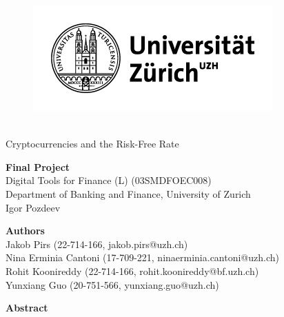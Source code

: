 \thispagestyle{empty}


\begin{figure}[!h]
\centering
\includegraphics{images/uzh_logo.pdf}\\\
\end{figure}
\vspace{1cm}

\begin{center}
\huge {Cryptocurrencies and the Risk-Free Rate}
\end{center}
\vspace{1cm}

\begin{center}
\large \textbf{Final Project}\\
\vspace{0.5cm}
Digital Tools for Finance (L) (03SMDFOEC008)\\
Department of Banking and Finance, University of Zurich\\
Igor Pozdeev
\end{center}
\vspace{1cm}

\begin{center}
\large \textbf{Authors}\\
\vspace{0.5cm}
Jakob Pirs (22-714-166, jakob.pirs@uzh.ch)\\

Nina Erminia Cantoni (17-709-221, ninaerminia.cantoni@uzh.ch)\\

Rohit Koonireddy (22-714-166, rohit.koonireddy@bf.uzh.ch)\\

Yunxiang Guo (20-751-566, yunxiang.guo@uzh.ch)\\
\end{center}
\vspace{1cm}

\begin{center}
\large \textbf{Abstract}\\
\vspace{0.5cm}
\begin{justify}

\end{justify}
\end{center}
\vspace{1cm}


